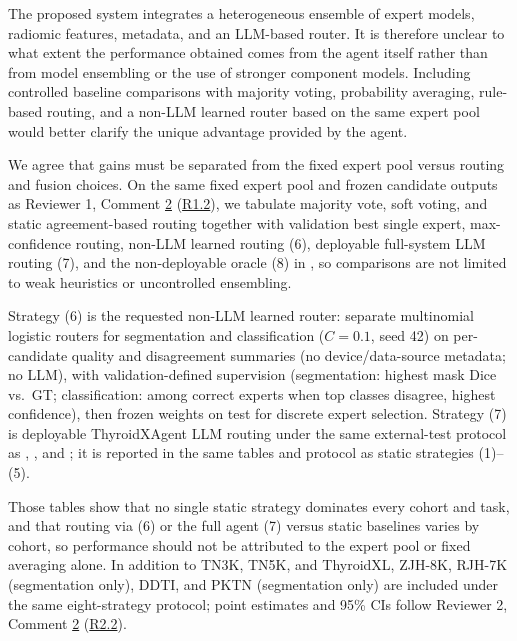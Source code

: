 \label{rev:R3.1}
\begin{reviewercomment}
The proposed system integrates a heterogeneous ensemble of expert models, radiomic features, metadata, and an LLM-based router. It is therefore unclear to what extent the performance obtained comes from the agent itself rather than from model ensembling or the use of stronger component models. Including controlled baseline comparisons with majority voting, probability averaging, rule-based routing, and a non-LLM learned router based on the same expert pool would better clarify the unique advantage provided by the agent.
\end{reviewercomment}
\begin{authorresponse}
We agree that gains must be separated from the fixed expert pool versus routing and fusion choices. On the same fixed expert pool and frozen candidate outputs as Reviewer 1, Comment \hyperref[rev:R1.2]{2} (\hyperref[rev:R1.2]{R1.2}), we tabulate majority vote, soft voting, and static agreement-based routing together with validation best single expert, max-confidence routing, non-LLM learned routing (6), deployable full-system LLM routing (7), and the non-deployable oracle (8) in , so comparisons are not limited to weak heuristics or uncontrolled ensembling.\par
Strategy (6) is the requested non-LLM learned router: separate multinomial logistic routers for segmentation and classification ($C{=}0.1$, seed 42) on per-candidate quality and disagreement summaries (no device/data-source metadata; no LLM), with validation-defined supervision (segmentation: highest mask Dice vs.\ GT; classification: among correct experts when top classes disagree, highest confidence), then frozen weights on test for discrete expert selection. Strategy (7) is deployable ThyroidXAgent LLM routing under the same external-test protocol as , , and ; it is reported in the same tables and protocol as static strategies (1)--(5).\par
Those tables show that no single static strategy dominates every cohort and task, and that routing via (6) or the full agent (7) versus static baselines varies by cohort, so performance should not be attributed to the expert pool or fixed averaging alone. In addition to TN3K, TN5K, and ThyroidXL, ZJH-8K, RJH-7K (segmentation only), DDTI, and PKTN (segmentation only) are included under the same eight-strategy protocol; point estimates and 95\% CIs follow Reviewer 2, Comment \hyperref[rev:R2.2]{2} (\hyperref[rev:R2.2]{R2.2}).\par
\par
\end{authorresponse}

